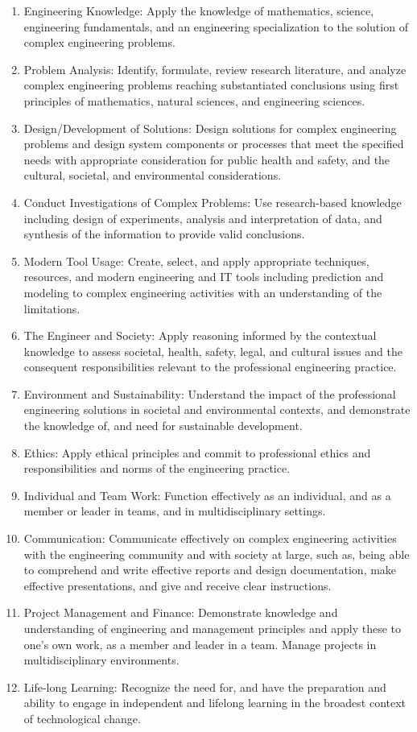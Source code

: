 \begin{enumerate}
	\item {Engineering Knowledge:} Apply the knowledge of mathematics, science, engineering fundamentals, and an engineering specialization to the solution of complex engineering problems.
	\item {Problem Analysis:} Identify, formulate, review research literature, and analyze complex engineering problems reaching substantiated conclusions using first principles of mathematics, natural sciences, and engineering sciences.
	\item {Design/Development of Solutions:} Design solutions for complex engineering problems and design system components or processes that meet the specified needs with appropriate consideration for public health and safety, and the cultural, societal, and environmental considerations.
	\item {Conduct Investigations of Complex Problems:} Use research-based knowledge including design of experiments, analysis and interpretation of data, and synthesis of the information to provide valid conclusions.
	\item {Modern Tool Usage:} Create, select, and apply appropriate techniques, resources, and modern engineering and IT tools including prediction and modeling to complex engineering activities with an understanding of the limitations.
	\item {The Engineer and Society:} Apply reasoning informed by the contextual knowledge to assess societal, health, safety, legal, and cultural issues and the consequent responsibilities relevant to the professional engineering practice.
	\item {Environment and Sustainability:} Understand the impact of the professional engineering solutions in societal and environmental contexts, and demonstrate the knowledge of, and need for sustainable development.
	\item {Ethics:} Apply ethical principles and commit to professional ethics and responsibilities and norms of the engineering practice.
	\item {Individual and Team Work:} Function effectively as an individual, and as a member or leader in teams, and in multidisciplinary settings.
	\item {Communication:} Communicate effectively on complex engineering activities with the engineering community and with society at large, such as, being able to comprehend and write effective reports and design documentation, make effective presentations, and give and receive clear instructions.
	\item {Project Management and Finance:} Demonstrate knowledge and understanding of engineering and management principles and apply these to one’s own work, as a member and leader in a team. Manage projects in multidisciplinary environments.
	\item {Life-long Learning:} Recognize the need for, and have the preparation and ability to engage in independent and lifelong learning in the broadest context of technological change.
\end{enumerate}

